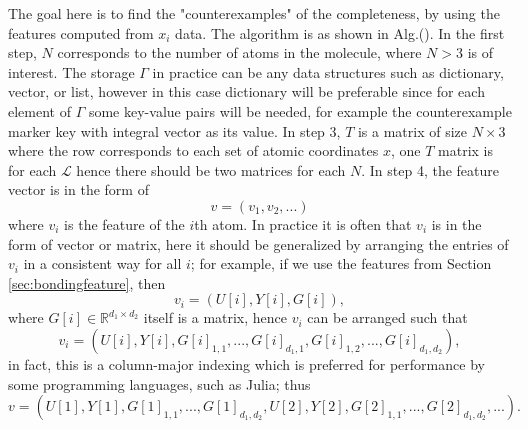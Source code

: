 \documentclass[12pt]{article}
\begin{document}
The goal here is to find the "counterexamples" of the completeness, by using the features computed from $x_i$ data. 
The algorithm is as shown in Alg.(). 
In the first step, $N$ corresponds to the number of atoms in the molecule, where $N > 3$ is of interest.
The storage $\Gamma$ in practice can be any data structures such as dictionary, vector, or list, however in this case dictionary will be preferable since for each element of $\Gamma$ some key-value pairs will be needed, for example the counterexample marker key with integral vector as its value.
In step 3, $T$ is a matrix of size $N \times 3$ where the row corresponds to each set of atomic coordinates $x$, one $T$ matrix is for each $\mathcal{L}$ hence there should be two matrices for each $N$.
In step 4, the feature vector is in the form of 
\begin{equation*}
    v = (v_1, v_2, ...)
\end{equation*}
where $v_i$ is the feature of the $i$th atom. In practice it is often that $v_i$ is in the form of vector or matrix, here it should be generalized by arranging the entries of $v_i$ in a consistent way for all $i$;
for example, if we use the features from Section \ref{sec:bondingfeature}, then
\begin{equation*}
    v_i = (U[i], Y[i], G[i]),
\end{equation*}
where $G[i] \in \mathbb{R}^{d_1 \times d_2}$ itself is a matrix, hence $v_i$ can be arranged such that
\begin{equation*}
    v_i = (U[i], Y[i], G[i]_{1,1},..., G[i]_{d_1,1}, G[i]_{1,2},...,  G[i]_{d_1,d_2}),
\end{equation*}
in fact, this is a column-major indexing which is preferred for performance by some programming languages, such as Julia;
thus
\begin{equation*}
    v = (U[1], Y[1], G[1]_{1,1},..., G[1]_{d_1,d_2}, U[2], Y[2], G[2]_{1,1},..., G[2]_{d_1,d_2}, ...).
\end{equation*}
\end{document}
